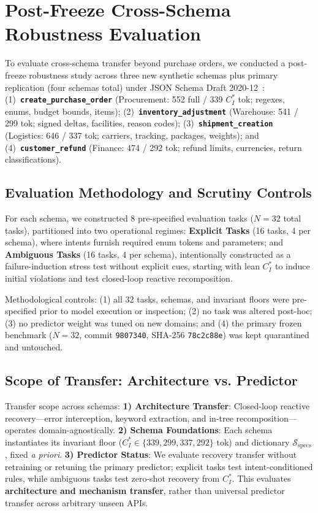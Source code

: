 \section{Post-Freeze Cross-Schema Robustness Evaluation}
\label{sec:cross_schema}


To evaluate cross-schema transfer beyond purchase orders, we conducted a post-freeze robustness study across three new synthetic schemas plus primary replication (four schemas total) under JSON Schema Draft 2020-12~\cite{jsonschema202012}: (1)~\textbf{\texttt{create\_purchase\_order}} (Procurement: 552 full / 339 $C_I^*$ tok; regexes, enums, budget bounds, items); (2)~\textbf{\texttt{inventory\_adjustment}} (Warehouse: 541 / 299 tok; signed deltas, facilities, reason codes); (3)~\textbf{\texttt{shipment\_creation}} (Logistics: 646 / 337 tok; carriers, tracking, packages, weights); and (4)~\textbf{\texttt{customer\_refund}} (Finance: 474 / 292 tok; refund limits, currencies, return classifications).

\subsection{Evaluation Methodology and Scrutiny Controls}
For each schema, we constructed 8 pre-specified evaluation tasks ($N=32$ total tasks), partitioned into two operational regimes: \textbf{Explicit Tasks} (16 tasks, 4 per schema), where intents furnish required enum tokens and parameters; and \textbf{Ambiguous Tasks} (16 tasks, 4 per schema), intentionally constructed as a failure-induction stress test without explicit cues, starting with lean $C_I^*$ to induce initial violations and test closed-loop reactive recomposition.

Methodological controls: (1) all 32 tasks, schemas, and invariant floors were pre-specified prior to model execution or inspection; (2) no task was altered post-hoc; (3) no predictor weight was tuned on new domains; and (4) the primary frozen benchmark ($N=32$, commit \texttt{9807340}, SHA-256 \texttt{78c2c88e}) was kept quarantined and untouched.

\subsection{Scope of Transfer: Architecture vs. Predictor}
Transfer scope across schemas: \textbf{1) Architecture Transfer}: Closed-loop reactive recovery---error interception, keyword extraction, and in-tree recomposition---operates domain-agnostically. \textbf{2) Schema Foundations}: Each schema instantiates its invariant floor ($C_I^* \in \{339, 299, 337, 292\}$ tok) and dictionary $\mathcal{S}_{\text{specs}}$, fixed \textit{a priori}. \textbf{3) Predictor Status}: We evaluate recovery transfer without retraining or retuning the primary predictor; explicit tasks test intent-conditioned rules, while ambiguous tasks test zero-shot recovery from $C_I^*$. This evaluates \textbf{architecture and mechanism transfer}, rather than universal predictor transfer across arbitrary unseen APIs.

